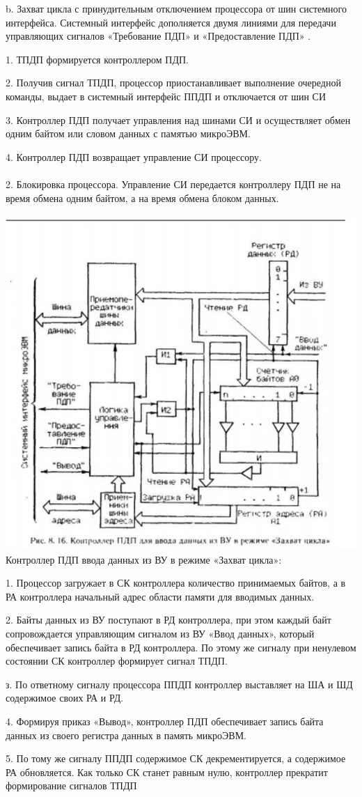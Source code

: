 \documentclass{article}
\begin{document}
b. Захват цикла с принудительным отключением процессора от шин системного интерфейса. Системный интерфейс дополняется двумя линиями для передачи управляющих сигналов
«Требование ПДП» и «Предоставление ПДП» .

1. ТПДП формируется контроллером ПДП.

2. Получив сигнал ТПДП, процессор приостанавливает выполнение очередной команды, выдает в системный интерфейс ППДП и отключается от шин СИ

3. Контроллер ПДП получает управления над шинами СИ и осуществляет обмен
одним байтом или словом данных с памятью микроЭВМ.

4. Контроллер ПДП возвращает управление СИ процессору.\\ \\
2. Блокировка процессора. Управление СИ передается контроллеру
ПДП не на время обмена одним байтом, а на время обмена блоком данных.
 \\ \\
 \includegraphics[width=.8\textwidth]{pdp.png}\\
Контроллер ПДП ввода данных из ВУ в режиме «Захват цикла»:

1. Процессор загружает в СК контроллера количество принимаемых байтов, а в РА контроллера начальный адрес области памяти для вводимых данных.

2. Байты данных из ВУ поступают в РД контроллера, при этом каждый байт сопровождается управляющим сигналом из ВУ «Ввод данных», который обеспечивает запись байта в РД контроллера. По этому же сигналу при ненулевом состоянии СК контроллер формирует сигнал ТПДП.

з. По ответному сигналу процессора ППДП контроллер выставляет на ША и ШД содержимое своих РА и РД.

4. Формируя приказ «Вывод», контроллер ПДП обеспечивает запись байта данных из своего регистра данных в память микроЭВМ.

5. По тому же сигналу ППДП содержимое СК декрементируется, а содержимое РА обновляется. Как только СК станет равным нулю, контроллер прекратит формирование сигналов ТПДП
\end{document}
